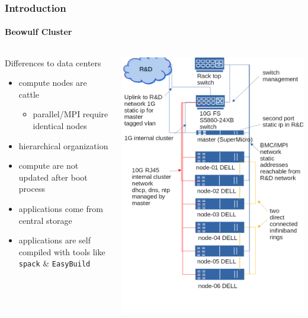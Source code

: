 \documentclass[aspectratio=169]{beamer}
\begin{document}
\begin{frame}[fragile]
\frametitle{Introduction}
\framesubtitle{Beowulf Cluster}
\begin{columns}
\begin{block}{Differences to data centers}
  \begin{itemize}
    \item compute nodes are cattle
    \begin{itemize}
      \item parallel/MPI require identical nodes
    \end{itemize}
    \item hierarchical organization
    \item compute are not updated after boot process
    \item applications come from central storage
    \item applications are self compiled with tools like \texttt{spack} \& \texttt{EasyBuild}
  \end{itemize}
\end{block}
  \includegraphics[width=.6\linewidth]{networkplan}
\end{columns}
\end{frame}
\end{document}
